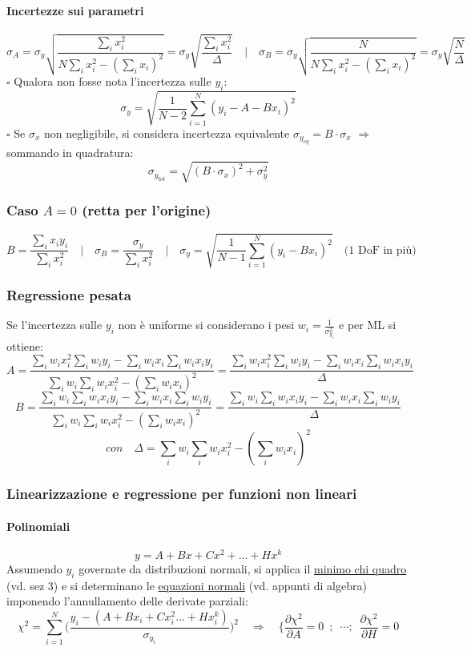 \documentclass[11pt]{article}
\begin{document}
\paragraph{Incertezze sui parametri}
\[\sigma_A = \sigma_y \sqrt{\frac{\sum_i x_i^2}{N \sum_i x_i^2 - (\sum_i x_i)^2}} = \sigma_y \sqrt{\frac{\sum_i x_i^2}{\Delta}} \quad \Bigg| \quad \sigma_B = \sigma_y \sqrt{\frac{N}{N \sum_i x_i^2 - (\sum_i x_i)^2}} = \sigma_y \sqrt{\frac{N}{\Delta}}\]
$\square$ Qualora non fosse nota l'incertezza sulle $y_i$:
\[\sigma_y = \sqrt{\frac{1}{N-2} \sum \limits_{i = 1}^{N} (y_i - A - B x_i)^2}\]
$\square$ Se $\sigma_x$ non negligibile, si considera incertezza equivalente $\sigma_{y_{eq}} = B \cdot \sigma_x$ $\Longrightarrow$ sommando in quadratura:
\[\sigma_{y_{tot}} = \sqrt{(B \cdot \sigma_x)^2 + \sigma_y^2}\]

\subsubsection*{Caso $A = 0$ (retta per l'origine)}
\[B = \frac{\sum_i x_i y_i}{\sum_i x_i^2} \quad \Bigg| \quad \sigma_B = \frac{\sigma_y}{\sum_i x_i^2} \quad \Bigg| \quad \sigma_y = \sqrt{\frac{1}{N-1} \sum \limits_{i = 1}^{N} (y_i - B x_i)^2} \quad \textrm{(1 DoF in più)}\]

\subsubsection*{Regressione pesata}
Se l'incertezza sulle $y_i$ non è uniforme si considerano i pesi $w_i = \frac{1}{\sigma_{y_i}^2}$ e per ML si ottiene:
\[A = \frac{\sum_i w_i x_i^2 \sum_i w_i y_i - \sum_i w_i x_i \sum_i w_i x_i y_i}{\sum_i w_i \sum_i w_i x_i^2 - (\sum_i w_i x_i)^2} = \frac{\sum_i w_i x_i^2 \sum_i w_i y_i - \sum_i w_i x_i \sum_i w_i x_i y_i}{\Delta}\] 
\[B = \frac{\sum_i w_i \sum_i w_i x_i y_i - \sum_i w_i x_i \sum_i w_i y_i}{\sum_i w_i \sum_i w_i x_i^2 - (\sum_i w_i x_i)^2} = \frac{\sum_i w_i \sum_i w_i x_i y_i - \sum_i w_i x_i \sum_i w_i y_i}{\Delta}\]
\[con \quad \Delta = \sum_i w_i \sum_i w_i x_i^2 - (\sum_i w_i x_i)^2\]

\subsubsection*{Linearizzazione e regressione per funzioni non lineari}
\paragraph{Polinomiali}
\[y = A + B x + C x^2 + ... + H x^k\]
Assumendo $y_i$ governate da distribuzioni normali, si applica il \underline{minimo chi quadro} (vd. sez 3) e si determinano le \underline{equazioni normali} (vd. appunti di algebra) imponendo l'annullamento delle derivate parziali:
\[\chi^2 = \sum \limits_{i = 1}^N \Bigg( \frac{y_i - (A + B x_i + C x_i^2... + H x_i^k)}{\sigma_{y_i}}\Bigg)^2 \quad \Rightarrow \quad \Bigg\{ \frac{\partial \chi^2}{\partial A} = 0 \enspace ; \enspace \cdots ; \enspace  \frac{\partial \chi^2}{\partial H} = 0 \]
\end{document}
